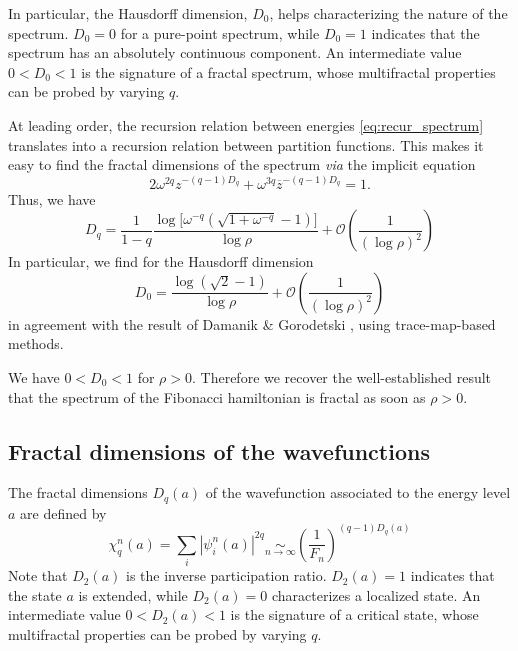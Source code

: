 \documentclass[11pt]{article}
\newcommand{\simlim}[2]{\ensuremath{ \underset{#1 \rightarrow #2}{\sim} }}
\newcommand{\zb}{\ensuremath{\overline{z}}}
\begin{document}
In particular, the Hausdorff dimension, $D_0$, helps characterizing the nature of the spectrum. 
$D_0 = 0$ for a pure-point spectrum, while $D_0 = 1$ indicates that the spectrum has an absolutely continuous component.
An intermediate value $0 < D_0 < 1$ is the signature of a fractal spectrum, whose multifractal properties can be probed by varying $q$.

At leading order, the recursion relation between energies \eqref{eq:recur_spectrum} translates into a recursion relation between partition functions. 
This makes it easy to find the fractal dimensions of the spectrum \cite{Piechon95} \emph{via} the implicit equation
\begin{equation}
	2 \omega^{2 q} z^{-(q-1)D_q}+\omega^{3 q} \zb^{-(q-1)D_q} = 1.
\end{equation}
Thus, we have
\begin{equation}
	D_q = \frac{1}{1-q} \frac{\log \big[\omega^{-q} \left( \sqrt{1+\omega^{-q}} -1\right) \big]}{\log \rho} + \mathcal{O}\left( \frac{1}{(\log \rho)^2} \right)
\end{equation}
In particular, we find for the Hausdorff dimension
\begin{equation}
	D_0 = \frac{\log( \sqrt{2} -1 )}{\log \rho} + \mathcal{O}\left( \frac{1}{(\log \rho)^2} \right)
\end{equation}
in agreement with the result of Damanik \& Gorodetski \cite{DamanikGorodetski}, using trace-map-based methods.

We have $0 < D_0 < 1$ for $\rho > 0$. 
Therefore we recover the well-established result that the spectrum of the Fibonacci hamiltonian is fractal as soon as $\rho > 0$.

\subsection{Fractal dimensions of the wavefunctions}

The fractal dimensions $D_q(a)$ of the wavefunction associated to the energy level $a$ are defined by
\begin{equation}
	\chi_q^n(a) = \sum_i |\psi_i^n(a)|^{2q} \simlim{n}{\infty} \left( \frac{1}{F_n} \right)^{(q-1)D_q(a)}
\end{equation}
Note that $D_2(a)$ is the inverse participation ratio.
$D_2(a) = 1$ indicates that the state $a$ is extended, while $D_2(a) = 0$ characterizes a localized state.
An intermediate value $0 < D_2(a) < 1$ is the signature of a critical state, whose multifractal properties can be probed by varying $q$.
\end{document}
